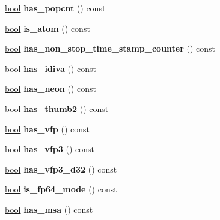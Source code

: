 \begin{DoxyCompactItemize}
\mbox{\label{classv8_1_1base_1_1CPU_a8515f813bae689e8b933d5361b0658b1}} 
\mbox{\hyperlink{classbool}{bool}} {\bfseries has\+\_\+popcnt} () const
\item 
\mbox{\label{classv8_1_1base_1_1CPU_a76bf2009aaff8c2b87a8c4694b951693}} 
\mbox{\hyperlink{classbool}{bool}} {\bfseries is\+\_\+atom} () const
\item 
\mbox{\label{classv8_1_1base_1_1CPU_a87c117682b0760245e15e88266b98097}} 
\mbox{\hyperlink{classbool}{bool}} {\bfseries has\+\_\+non\+\_\+stop\+\_\+time\+\_\+stamp\+\_\+counter} () const
\item 
\mbox{\label{classv8_1_1base_1_1CPU_a79c4cbd5e3c5d2b0351b737831f9779f}} 
\mbox{\hyperlink{classbool}{bool}} {\bfseries has\+\_\+idiva} () const
\item 
\mbox{\label{classv8_1_1base_1_1CPU_a2dacb724684d3c62a83091811a25c445}} 
\mbox{\hyperlink{classbool}{bool}} {\bfseries has\+\_\+neon} () const
\item 
\mbox{\label{classv8_1_1base_1_1CPU_af0dc6125407e57168f6bc1fbd8c298dd}} 
\mbox{\hyperlink{classbool}{bool}} {\bfseries has\+\_\+thumb2} () const
\item 
\mbox{\label{classv8_1_1base_1_1CPU_a01f30290b97143b231a5326c4f3ecf07}} 
\mbox{\hyperlink{classbool}{bool}} {\bfseries has\+\_\+vfp} () const
\item 
\mbox{\label{classv8_1_1base_1_1CPU_a7cc45df94697da72f1450aec03dc8fa9}} 
\mbox{\hyperlink{classbool}{bool}} {\bfseries has\+\_\+vfp3} () const
\item 
\mbox{\label{classv8_1_1base_1_1CPU_affcd5cae51c2b86f4052dbc8f565e170}} 
\mbox{\hyperlink{classbool}{bool}} {\bfseries has\+\_\+vfp3\+\_\+d32} () const
\item 
\mbox{\label{classv8_1_1base_1_1CPU_aa51a1ef3ba02fcbde40153de8508d58e}} 
\mbox{\hyperlink{classbool}{bool}} {\bfseries is\+\_\+fp64\+\_\+mode} () const
\item 
\mbox{\label{classv8_1_1base_1_1CPU_ac968628533d15f78faaf800de68d7ba9}} 
\mbox{\hyperlink{classbool}{bool}} {\bfseries has\+\_\+msa} () const
\end{DoxyCompactItemize}
